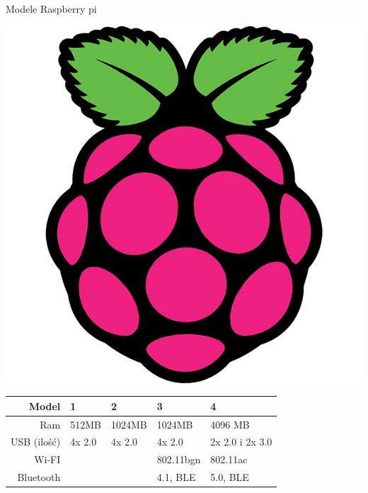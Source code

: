     \begin{frame}{Modele Raspberry pi}

        \centering
        \includegraphics[height = 0.5 \textheight]{images/2raspberry.png}
        \begin{table}[t]
            \begin{tabular}{|r|l|l|l|l|}
                \hline 
                    Model & 1 & 2 & 3 & 4\\
                \hline
                    Ram & 512MB & 1024MB & 1024MB & 4096 MB\\
                \hline
                    USB (ilość) & 4x 2.0 & 4x 2.0 & 4x 2.0 & 2x 2.0 i 2x 3.0\\
                \hline
                    Wi-FI & & & 802.11bgn & 802.11ac\\
                \hline
                    Bluetooth & & & 4.1, BLE & 5.0, BLE\\
                \hline
                \end{tabular}
            \end{table}
    \end{frame}